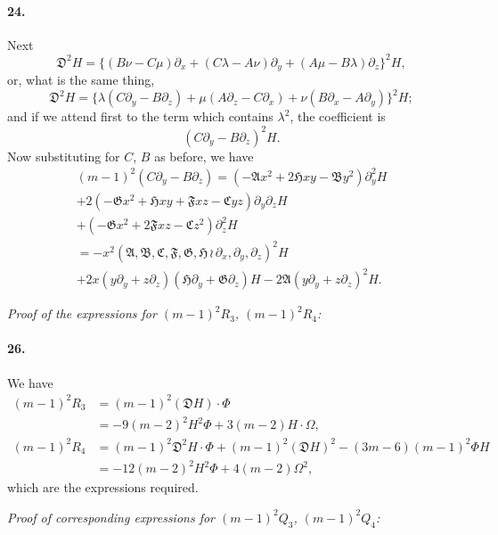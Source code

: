 \documentclass[11pt,a4paper]{book}
\begin{document}
\newpage

\paragraph{24.}
Next
\[
\mathfrak{D}^2 H = \{(B\nu - C\mu)\partial_x + (C\lambda - A\nu)\partial_y + (A\mu - B\lambda)\partial_z\}^2 H,
\]
or,  what  is  the  same  thing,
\[
\mathfrak{D}^2 H = \{\lambda(C\partial_y - B\partial_z) + \mu(A\partial_z - C\partial_x) + \nu(B\partial_x - A\partial_y)\}^2 H;
\]
and  if  we  attend  first  to  the  term  which  contains  $\lambda^2$,  the  coefficient  is
\[
(C\partial_y - B\partial_z)^2 H.
\]
Now  substituting  for  $C$,  $B$  as  before,  we  have
\begin{multline*}
(m-1)^2 (C\partial_y - B\partial_z) = (-\mathfrak{A}x^2 + 2\mathfrak{H}xy - \mathfrak{B}y^2)\partial_y^2 H \\
+ 2(-\mathfrak{G}x^2 + \mathfrak{H}xy + \mathfrak{F}xz - \mathfrak{C}yz)\partial_y \partial_z H \\
+ (-\mathfrak{G}x^2 + 2\mathfrak{F}xz - \mathfrak{C}z^2)\partial_z^2 H \\
= -x^2 (\mathfrak{A}, \mathfrak{B}, \mathfrak{C}, \mathfrak{F}, \mathfrak{G}, \mathfrak{H} \,\!\!\wr\, \partial_x, \partial_y, \partial_z)^2 H \\
+ 2x(y\partial_y + z\partial_z)(\mathfrak{H}\partial_y + \mathfrak{G}\partial_z)H - 2\mathfrak{A}(y\partial_y + z\partial_z)^2 H.
\end{multline*}


\newpage

\noindent\textit{Proof of the expressions for $(m-1)^2 R_3$, $(m-1)^2 R_4$:}

\paragraph{26.}
We  have
\begin{align*}
(m-1)^2 R_3 &= (m-1)^2 (\mathfrak{D} H) \cdot \Phi \\
&= -9(m-2)^2 H^2 \Phi + 3(m-2)H \cdot \Omega, \\
(m-1)^2 R_4 &= (m-1)^2 \mathfrak{D}^2 H \cdot \Phi + (m-1)^2 (\mathfrak{D} H)^2 - (3m-6)(m-1)^2 \Phi H \\
&= -12(m-2)^2 H^2 \Phi + 4(m-2) \Omega^2,
\end{align*}
which  are  the  expressions  required.

\noindent\textit{Proof  of  corresponding  expressions  for  $(m-1)^2 Q_3$,  $(m-1)^2 Q_4$:}
\end{document}
